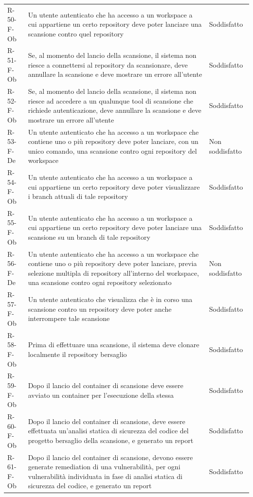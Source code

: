 \documentclass[a4paper, 11pt]{article}
\begin{document}
\begin{longtable}[c]{ >{\centering\arraybackslash}m{2.5cm} >{\centering\arraybackslash}m{8.3cm} >{\centering\arraybackslash}m{3.5cm} }
R-50-F-Ob & Un utente autenticato che ha accesso a un workspace a cui appartiene un certo repository deve poter lanciare una scansione contro quel repository & Soddisfatto\\
R-51-F-Ob & Se, al momento del lancio della scansione, il sistema non riesce a connettersi al repository da scansionare, deve annullare la scansione e deve mostrare un errore all'utente & Soddisfatto\\
R-52-F-Ob & Se, al momento del lancio della scansione, il sistema non riesce ad accedere a un qualunque tool di scansione che richiede autenticazione, deve annullare la scansione e deve mostrare un errore all'utente & Soddisfatto\\
R-53-F-De & Un utente autenticato che ha accesso a un workspace che contiene uno o più repository deve poter lanciare, con un unico comando, una scansione contro ogni repository del workspace & Non soddisfatto\\
R-54-F-Ob & Un utente autenticato che ha accesso a un workspace a cui appartiene un certo repository deve poter visualizzare i branch attuali di tale repository & Soddisfatto\\
R-55-F-Ob & Un utente autenticato che ha accesso a un workspace a cui appartiene un certo repository deve poter lanciare una scansione su un branch di tale repository & Soddisfatto\\
R-56-F-De & Un utente autenticato che ha accesso a un workspace che contiene uno o più repository deve poter lanciare, previa selezione multipla di repository all'interno del workspace, una scansione contro ogni repository selezionato & Non soddisfatto\\
R-57-F-Ob & Un utente autenticato che visualizza che è in corso una scansione contro un repository deve poter anche interrompere tale scansione & Soddisfatto\\
R-58-F-Ob & Prima di effettuare una scansione, il sistema deve clonare localmente il repository bersaglio & Soddisfatto\\
R-59-F-Ob & Dopo il lancio del container di scansione deve essere avviato un container per l'esecuzione della stessa & Soddisfatto\\
R-60-F-Ob & Dopo il lancio del container di scansione, deve essere effettuata un'analisi statica di sicurezza del codice del progetto bersaglio della scansione, e generato un report & Soddisfatto\\
R-61-F-Ob & Dopo il lancio del container di scansione, devono essere generate remediation di una vulnerabilità, per ogni vulnerabilità individuata in fase di analisi statica di sicurezza del codice, e generato un report & Soddisfatto\\

\end{longtable}
\end{document}
